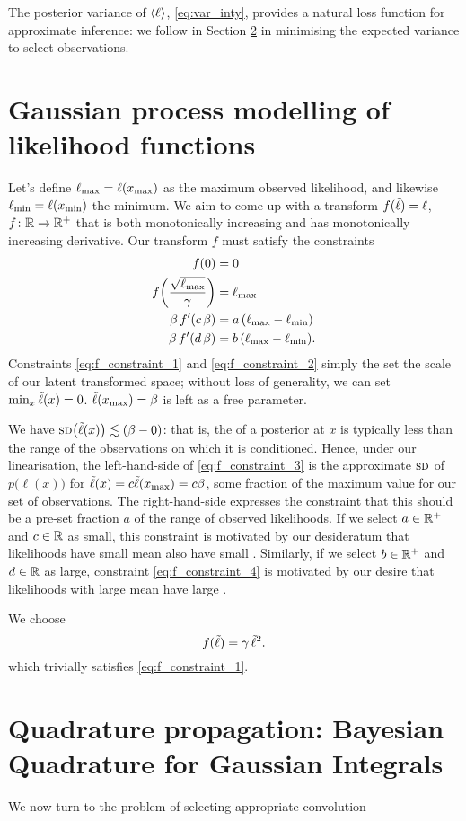 \documentclass[twoside]{article}
\begin{document}
The posterior variance of $\langle \ell \rangle$, \eqref{eq:var_inty}, provides a natural loss function for approximate inference: we follow \citet{osborne2012active} in Section \ref{sec:active} in minimising the expected variance to select observations. 

\section{Gaussian process modelling of likelihood functions}
Let's define $\ell_\text{max} = \ell(x_\text{max})$ as the maximum observed likelihood, and likewise $\ell_\text{min} = \ell(x_\text{min})$ the minimum. We aim to come up with a transform $f({\tilde{\ell}}) = \ell$, $f\colon \mathbb{R} \to \mathbb{R}^+$ that is both monotonically increasing and has monotonically increasing derivative. 
Our transform $f$ must satisfy the constraints 
\begin{align}
 f(0) & = 0 \label{eq:f_constraint_1}\\
 f\biggl(\frac{\sqrt{\ell_\text{max}}}{\gamma}\biggr) & = \ell_\text{max} 
\label{eq:f_constraint_2}\\
 \beta\, f'(c\,\beta) & = a\,(\ell_\text{max} - \ell_\text{min}) \label{eq:f_constraint_3}\\
 \beta\, f'(d\,\beta) & = b\,(\ell_\text{max} - \ell_\text{min}). 
\label{eq:f_constraint_4}
\end{align}
Constraints \eqref{eq:f_constraint_1} and \eqref{eq:f_constraint_2} simply the set the scale of our latent transformed space; without loss of generality, we can set  
$\text{min}_{x}\,{\tilde{\ell}}(x)=0$. ${\tilde{\ell}}(x_\text{max})=\beta$ is left as a free parameter. 

We have $\textsc{sd}\bigl({\tilde{\ell}}(x)\bigr) \lesssim (\beta - 0)$: that is, the \sd of a \gp posterior at $x$ is typically less than the range of the observations on which it is conditioned. Hence, under our linearisation, the left-hand-side of \eqref{eq:f_constraint_3} is the approximate $\textsc{sd}$ of $p\bigl(\ell(x)\bigl)$ for ${\tilde{\ell}}(x) = c {\tilde{\ell}}(x_\text{max})=c \beta$, some fraction of the maximum value for our set of observations. The right-hand-side expresses the constraint that this should be a pre-set fraction $a$ of the range of observed likelihoods. If we select $a\in \mathbb{R}^+$ and $c\in \mathbb{R}$ as small, this constraint is motivated by our desideratum that likelihoods have small mean also have small \sd. Similarly, if we select $b\in \mathbb{R}^+$ and $d\in \mathbb{R}$ as large, constraint \eqref{eq:f_constraint_4} is motivated by our desire that likelihoods with large mean have large \sd .


We choose
\begin{equation}
 f({\tilde{\ell}}) = \gamma\,{\tilde{\ell}}^2.
\end{equation}
which trivially satisfies \eqref{eq:f_constraint_1}.


\begin{figure*}
\caption{}
\end{figure*}


\section{Quadrature propagation: Bayesian Quadrature for Gaussian Integrals}
\label{sec:active}

We now turn to the problem of selecting appropriate convolution 



\end{document}
